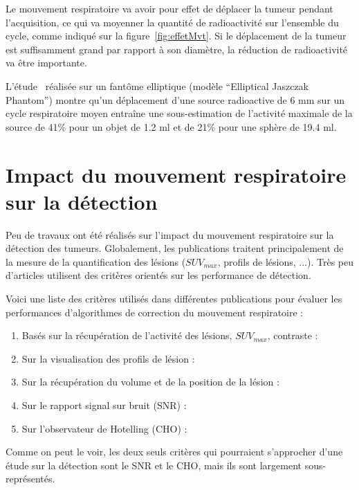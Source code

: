 Le mouvement respiratoire va avoir pour effet de déplacer la tumeur pendant l'acquisition, ce qui va moyenner la quantité de radioactivité sur l'ensemble du cycle, comme indiqué sur la figure~\ref{fig:effetMvt}. Si le déplacement de la tumeur est suffisamment grand par rapport à son diamètre, la réduction de radioactivité va être importante.

L'étude~\cite{boucher2004respiratory} réalisée sur un fantôme elliptique (modèle ``Elliptical Jaszczak Phantom'') montre qu'un déplacement d'une source radioactive de 6 mm sur un cycle respiratoire moyen entraîne une sous-estimation de l'activité maximale de la source de 41\% pour un objet de 1.2 ml et de 21\% pour une sphère de 19.4 ml.


\section{Impact du mouvement respiratoire sur la détection}

Peu de travaux ont été réalisés sur l'impact du mouvement respiratoire sur la détection des tumeurs. Globalement, les publications traitent  principalement de la mesure de la quantification des lésions ($SUV_{max}$, profils de lésions, ...). Très peu d'articles utilisent des critères orientés sur les performance de détection.

Voici une liste des critères utilisés dans différentes publications pour évaluer les performances d'algorithmes de correction du mouvement respiratoire :

\begin{enumerate}
 \item Basés sur la récupération de l'activité des lésions, $SUV_{max}$, contraste :~\cite{GuopingChang2010Implementation,lamare2007list,nehmeh2002effect,detorie2008quantitative}
 \item Sur la visualisation des profils de lésion :~\cite{GuopingChang2010Implementation,Thielemans2006Lesion,lamare2007list}
 \item Sur la récupération du volume et de la position de la lésion :~\cite{GuopingChang2010Implementation,lamare2007list,nehmeh2002effect}
 \item Sur le rapport signal sur bruit (SNR) :~\cite{GuopingChang2010Implementation}
 \item Sur l'observateur de Hotelling (CHO) :~\cite{Thielemans2006Lesion}
\end{enumerate}

Comme on peut le voir, les deux seuls critères qui pourraient s'approcher d'une étude sur la détection sont le SNR et le CHO, mais ils sont largement sous-représentés. 

